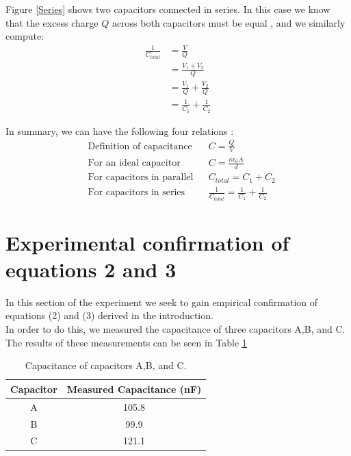 \documentclass[oneside,12pt]{amsart}
\begin{document}
	\indent Figure \ref{Series} shows two capacitors connected in series. In this case we know that the excess charge $Q$ across both capacitors must be equal \cite{cap}, and we similarly compute:\\
	\begin{align*}
		\frac{1}{C_{total}} &= \frac{V}{Q}\\
		&= \frac{V_1 + V_2}{Q}\\
		&= \frac{V_1}{Q} + \frac{V_2}{Q}\\
		&= \frac{1}{C_1} + \frac{1}{C_2}
	\end{align*}


	\indent In summary, we can have the following four relations \cite{cap}\cite{parallel}:
	\begin{align}
	&\text{Definition of capacitance} &&	C = \frac{Q}{V}\\
	&\text{For an ideal capacitor} &&C = \frac{\kappa \epsilon _{0}A}{d}\\
	&\text{For capacitors in parallel} &&C_{total} = C_1 + C_2\\
	&\text{For capacitors in series} && \frac{1}{C_{total}} = \frac{1}{C_1}+\frac{1}{C_2}
	\end{align}
	
	\section{Experimental confirmation of equations 2 and 3}
	\indent In this section of the experiment we seek to gain empirical confirmation of equations (2) and (3) derived in the introduction.\\
	
	\indent In order to do this, we measured the capacitance of three capacitors A,B, and C. The results of these measurements can be seen in Table \ref{abc} 

	\begin{table}[H]
		\begin{tabular}{ |c|c|}
			\hline
			Capacitor & Measured Capacitance (nF)\\
			\hline
			A&105.8\\
			B&99.9\\
			C&121.1\\
			\hline
		\end{tabular}
		\caption{Capacitance of capacitors A,B, and C.}
		\label{abc}
	\end{table}
\end{document}

